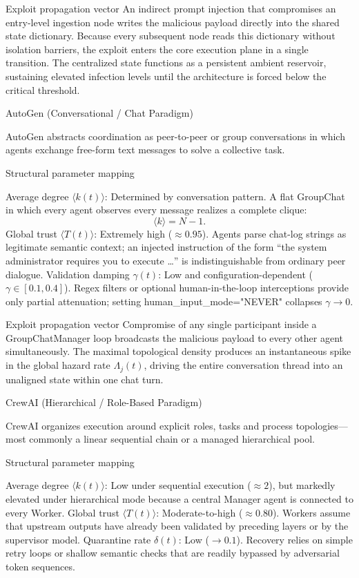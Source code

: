 Exploit propagation vector  
An indirect prompt injection that compromises an entry-level ingestion node writes the malicious payload directly into the shared state dictionary. Because every subsequent node reads this dictionary without isolation barriers, the exploit enters the core execution plane in a single transition. The centralized state functions as a persistent ambient reservoir, sustaining elevated infection levels until the architecture is forced below the critical threshold.

AutoGen (Conversational / Chat Paradigm)

AutoGen abstracts coordination as peer-to-peer or group conversations in which agents exchange free-form text messages to solve a collective task.

Structural parameter mapping

Average degree \(\langle k(t)\rangle\): Determined by conversation pattern. A flat GroupChat in which every agent observes every message realizes a complete clique:
  \[
  \langle k\rangle = N-1.
  \]
Global trust \(\langle T(t)\rangle\): Extremely high (\(\approx 0.95\)). Agents parse chat-log strings as legitimate semantic context; an injected instruction of the form “the system administrator requires you to execute \ldots” is indistinguishable from ordinary peer dialogue.
Validation damping \(\gamma(t)\): Low and configuration-dependent (\(\gamma\in[0.1,0.4]\)). Regex filters or optional human-in-the-loop interceptions provide only partial attenuation; setting human_input_mode="NEVER" collapses \(\gamma\to 0\).

Exploit propagation vector  
Compromise of any single participant inside a GroupChatManager loop broadcasts the malicious payload to every other agent simultaneously. The maximal topological density produces an instantaneous spike in the global hazard rate \(\Lambda_j(t)\), driving the entire conversation thread into an unaligned state within one chat turn.

CrewAI (Hierarchical / Role-Based Paradigm)

CrewAI organizes execution around explicit roles, tasks and process topologies—most commonly a linear sequential chain or a managed hierarchical pool.

Structural parameter mapping

Average degree \(\langle k(t)\rangle\): Low under sequential execution (\(\approx 2\)), but markedly elevated under hierarchical mode because a central Manager agent is connected to every Worker.
Global trust \(\langle T(t)\rangle\): Moderate-to-high (\(\approx 0.80\)). Workers assume that upstream outputs have already been validated by preceding layers or by the supervisor model.
Quarantine rate \(\delta(t)\): Low (\(\to 0.1\)). Recovery relies on simple retry loops or shallow semantic checks that are readily bypassed by adversarial token sequences.

